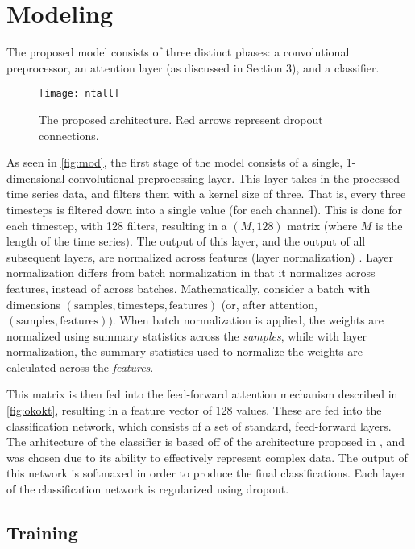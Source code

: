 \section{Modeling}

The proposed model consists of three distinct phases: a convolutional preprocessor, an attention layer (as discussed in Section 3), and a classifier. 

\begin{figure}[H]
\caption{The proposed architecture. Red arrows represent dropout connections.}
\label{fig:mod}
\centering
\texttt{[image: ntall]}
\end{figure}

As seen in \autoref{fig:mod}, the first stage of the model consists of a single, 1-dimensional convolutional preprocessing layer. This  layer takes in the processed time series data, and filters them with a kernel size of three. That is, every three timesteps is filtered down into a single value (for each channel). This is done for each timestep, with 128 filters, resulting in a $(M, 128)$ matrix (where $M$ is the length of the time series). The output of this layer, and the output of all subsequent layers, are normalized across features (layer normalization) \cite{layernorm}. Layer normalization differs from batch normalization in that it normalizes across features, instead of across batches. Mathematically, consider a batch with dimensions $\bm{\left(\mathrm{samples }, \mathrm{timesteps }, \mathrm{features }\right)}$ (or, after attention, $\bm{\left(\mathrm{samples }, \mathrm{features }\right)}$). When batch normalization is applied, the weights are normalized using summary statistics across the \emph{samples}, while with layer normalization, the summary statistics used to normalize the weights are calculated across the \emph{features}.
\par
This matrix is then fed into the feed-forward attention mechanism described in \autoref{fig:okokt}, resulting in a feature vector of 128 values. These are fed into the classification network, which consists of a set of standard, feed-forward layers. The arhitecture of the classifier is based off of the architecture proposed  in \cite{dbn}, and was chosen due to its ability to effectively represent complex data. The output of this network is softmaxed in order to produce the final classifications. Each layer of the classification network is regularized using dropout.

\subsection{Training}

